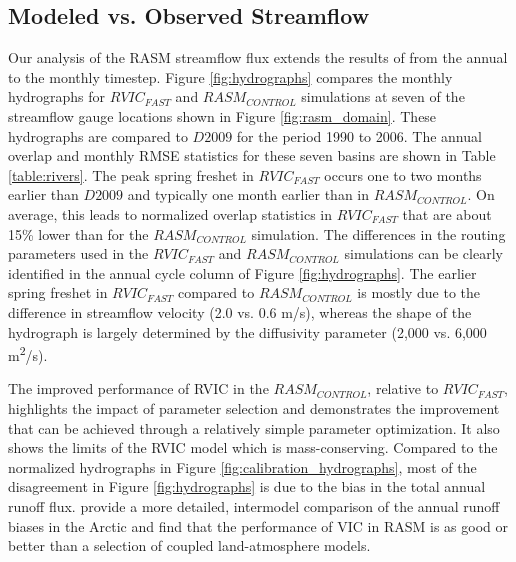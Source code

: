 \documentclass[jgrga, draft]{agutex}
\begin{document}
\begin{article}
\subsection{Modeled vs. Observed Streamflow}
\label{sec:hydrographs}

Our analysis of the RASM streamflow flux extends the results of \citet{Hamman_2016} from the annual to the monthly timestep.
Figure \ref{fig:hydrographs} compares the monthly hydrographs for $RVIC_{FAST}$ and $RASM_{CONTROL}$ simulations at seven of the streamflow gauge locations shown in Figure \ref{fig:rasm_domain}.
These hydrographs are compared to $D2009$ for the period 1990 to 2006.
The annual overlap and monthly RMSE statistics for these seven basins are shown in Table \ref{table:rivers}.
The peak spring freshet in $RVIC_{FAST}$ occurs one to two months earlier than $D2009$ and typically one month earlier than in $RASM_{CONTROL}$.
On average, this leads to normalized overlap statistics in $RVIC_{FAST}$ that are about 15\% lower than for the $RASM_{CONTROL}$ simulation.
The differences in the routing parameters used in the $RVIC_{FAST}$ and $RASM_{CONTROL}$ simulations can be clearly identified in the annual cycle column of Figure \ref{fig:hydrographs}.
The earlier spring freshet in $RVIC_{FAST}$ compared to $RASM_{CONTROL}$ is mostly due to the difference in streamflow velocity (2.0 vs. 0.6 m/s), whereas the shape of the hydrograph is largely determined by the diffusivity parameter (2,000 vs. 6,000 m\textsuperscript{2}/s).

The improved performance of RVIC in the $RASM_{CONTROL}$, relative to $RVIC_{FAST}$, highlights the impact of parameter selection and demonstrates the improvement that can be achieved through a relatively simple parameter optimization.
It also shows the limits of the RVIC model which is mass-conserving.
Compared to the normalized hydrographs in Figure \ref{fig:calibration_hydrographs}, most of the disagreement in Figure \ref{fig:hydrographs} is due to the bias in the total annual runoff flux.
\citet{Hamman_2016} provide a more detailed, intermodel comparison of the annual runoff biases in the Arctic and find that the performance of VIC in RASM is as good or better than a selection of coupled land-atmosphere models.


\end{article}
\end{document}
